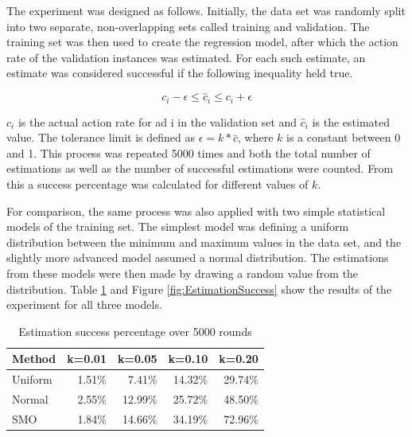\documentclass{sig-alternate}
\begin{document}
The experiment was designed as follows. Initially, the data set was randomly split into two separate, non-overlapping sets called training and validation. The training set was then used to create the regression model, after which the action rate of the validation instances was estimated. For each such estimate, an estimate was considered successful if the following inequality held true.

\[
	c_i - \epsilon \leq \hat{c}_i \leq c_i + \epsilon
\]

\(c_i\) is the actual action rate for ad i in the validation set and \(\hat{c}_i\) is the estimated value. The tolerance limit is defined as \(\epsilon = k*\bar{c}\), where \(k\) is a constant between 0 and 1. This process was repeated 5000 times and both the total number of estimations as well as the number of successful estimations were counted. From this a success percentage was calculated for different values of \(k\).

For comparison, the same process was also applied with two simple statistical models of the training set. The simplest model was defining a uniform distribution between the minimum and maximum values in the data set, and the slightly more advanced model assumed a normal distribution. The estimations from these models were then made by drawing a random value from the distribution. Table \ref{tbl:EstimationSuccess} and Figure \ref{fig:EstimationSuccess} show the results of the experiment for all three models.

\begin{table}[htbp]
\begin{center}
	\begin{tabular}{ l | r r r r }
		\hline
		\textbf{Method} & \textbf{k=0.01} & \textbf{k=0.05} & \textbf{k=0.10} & \textbf{k=0.20} \\
		\hline
		Uniform & 1.51\% & 7.41\% & 14.32\% & 29.74\% \\
		Normal & 2.55\% & 12.99\% & 25.72\% & 48.50\% \\
		SMO & 1.84\% & 14.66\% & 34.19\% & 72.96\% \\
		\hline
	\end{tabular}
	\caption{Estimation success percentage over 5000 rounds}
	\label{tbl:EstimationSuccess}
\end{center}
\end{table}
\end{document}
